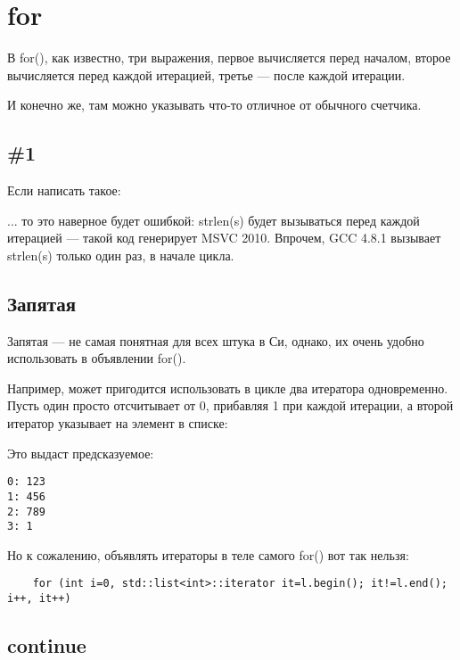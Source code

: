 ﻿\section{for}

В for(), как известно, три выражения, первое вычисляется перед началом, второе вычисляется перед каждой итерацией, третье --- после каждой итерации.

И конечно же, там можно указывать что-то отличное от обычного счетчика.

\subsection{ \#1}

Если написать такое:



... то это наверное будет ошибкой: strlen(s) будет вызываться перед каждой итерацией --- такой код генерирует
MSVC 2010. Впрочем, GCC 4.8.1 вызывает strlen(s) только один раз, в начале цикла.

\subsection{Запятая}

Запятая\cite[6.5.17]{C99TC3} --- не самая понятная для всех штука в Си, 
однако, их очень удобно использовать в объявлении for().

Например, может пригодится использовать в цикле два итератора одновременно. Пусть один просто отсчитывает
от 0, прибавляя 1 при каждой итерации, а второй итератор указывает на элемент в списке:



Это выдаст предсказуемое:

\begin{lstlisting}
0: 123
1: 456
2: 789
3: 1
\end{lstlisting}

Но к сожалению, объявлять итераторы в теле самого for() вот так нельзя:

\begin{lstlisting}
	for (int i=0, std::list<int>::iterator it=l.begin(); it!=l.end(); i++, it++)
\end{lstlisting}

\subsection{continue}

